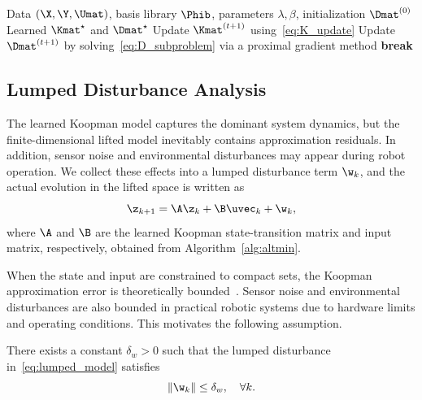 \begin{algorithm}[htbp]
\caption{Block Coordinate Descent Algorithm for Koopman Representation Learning}
\label{alg:altmin}
\begin{algorithmic}[1]
\REQUIRE Data $(\X,\Y,\Umat)$, basis library $\Phib$, parameters $\lambda,\beta$, initialization $\Dmat^{(0)}$
\ENSURE Learned $\Kmat^\star$ and $\Dmat^\star$
    \STATE Update $\Kmat^{(t+1)}$ using~\eqref{eq:K_update}
    \STATE Update $\Dmat^{(t+1)}$ by solving~\eqref{eq:D_subproblem} via a proximal gradient method
        \STATE \textbf{break}
    \ENDIF
\ENDFOR
\end{algorithmic}
\end{algorithm}

\subsection{Lumped Disturbance Analysis}
\label{subsec:error_quantification}

The learned Koopman model captures the dominant system dynamics, but the finite-dimensional lifted model inevitably contains approximation residuals. In addition, sensor noise and environmental disturbances may appear during robot operation. We collect these effects into a lumped disturbance term $\w_k$, and the actual evolution in the lifted space is written as
\begin{equation}
\label{eq:lumped_model}
\z_{k+1} = \A\z_k + \B\uvec_k + \w_k,
\end{equation}
where $\A$ and $\B$ are the learned Koopman state-transition matrix and input matrix, respectively, obtained from Algorithm~\ref{alg:altmin}.

When the state and input are constrained to compact sets, the Koopman approximation error is theoretically bounded~\cite{Korda2018MPC}. Sensor noise and environmental disturbances are also bounded in practical robotic systems due to hardware limits and operating conditions. This motivates the following assumption.

{
\begin{assumption}
\label{assump:bounded_disturbance}
There exists a constant $\delta_w>0$ such that the lumped disturbance in~\eqref{eq:lumped_model} satisfies
\begin{equation}
\|\w_k\| \le \delta_w, \quad \forall k.
\end{equation}
\end{assumption}
}

